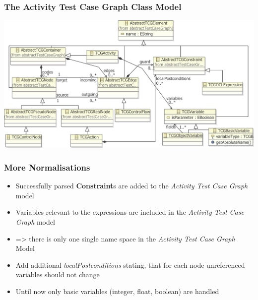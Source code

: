 \documentclass{beamer}
\newcommand{\UMLType}[1]{\textbf{#1}}
\begin{document}
\begin{frame}
\frametitle{The Activity Test Case Graph Class Model}
	\includegraphics[width=\textwidth]{../pics/completeMetamodelforSlideshowN.pdf}
\end{frame}


\begin{frame}
\frametitle{More Normalisations}
\begin{itemize}
\item Successfully parsed \UMLType{Constraint}s are added to the \emph{Activity Test Case Graph} model
\item Variables relevant to the expressions are included in the \emph{Activity Test Case Graph} model
\item => there is only one single name space in the \emph{Activity Test Case Graph} Model
\item Add additional \emph{localPostconditions} stating, that for each node unreferenced variables should not change
\item Until now only basic variables (integer, float, boolean) are handled
\end{itemize}
\end{frame}
\end{document}
